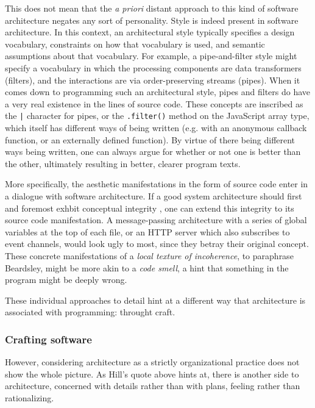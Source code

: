 This does not mean that the \emph{a priori} distant approach to this kind of software architecture negates any sort of personality. Style is indeed present in software architecture. In this context, an architectural style typically specifies a design vocabulary, constraints on how that vocabulary is used, and semantic assumptions about that vocabulary. For example, a pipe-and-filter style might specify a vocabulary in which the processing components are data transformers (filters), and the interactions are via order-preserving streams (pipes). When it comes down to programming such an architectural style, pipes and filters do have a very real existence in the lines of source code. These concepts are inscribed as the \lstinline{|} character for pipes, or the \lstinline{.filter()} method on the JavaScript array type, which itself has different ways of being written (e.g. with an anonymous callback function, or an externally defined function). By virtue of there being different ways being written, one can always argue for whether or not one is better than the other, ultimately resulting in better, clearer program texts.

More specifically, the aesthetic manifestations in the form of source code enter in a dialogue with software architecture. If a good system architecture should first and foremost exhbit conceptual integrity \citep{spinellis_beautiful_2009}, one can extend this integrity to its source code manifestation. A message-passing architecture with a series of global variables at the top of each file, or an HTTP server which also subscribes to event channels, would look ugly to most, since they betray their original concept. These concrete manifestations of a \emph{local texture of incoherence}, to paraphrase Beardsley, might be more akin to a \emph{code smell}, a hint that something in the program might be deeply wrong.

These individual approaches to detail hint at a different way that architecture is associated with programming: throught craft.

\subsubsection{Crafting software}
\label{subsubsec:crafting-software}

However, considering architecture as a strictly organizational practice does not show the whole picture. As Hill's quote above hints at, there is another side to architecture, concerned with details rather than with plans, feeling rather than rationalizing.

